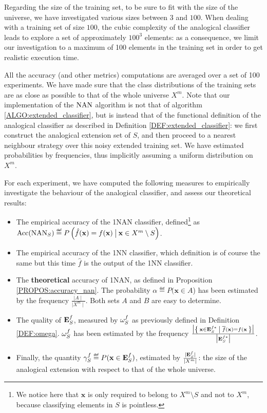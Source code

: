 Regarding the size of the training set, to be sure to fit with the size of the
universe, we have investigated various sizes between $3$ and $100$. When
dealing with a training set of size $100$, the cubic complexity of the
analogical classifier leads to explore a set of approximately $100^3$ elements:
as a consequence, we limit our investigation to a maximum of 100 elements in
the training set in order to get realistic execution time.

All the accuracy (and other metrics) computations are averaged over a set of
100 experiments. We have made sure that the class distributions of the training
sets are as close as possible to that of the whole universe $X^m$.  Note that
our implementation of the $\mbox{NAN}$ algorithm is not that of algorithm
\ref{ALGO:extended_classifier}, but is instead that of the functional
definition of the analogical classifier as described in Definition
\ref{DEF:extended_classifier}: we first construct the analogical extension set
of $S$, and then proceed to a nearest neighbour strategy over this noisy
extended training set. We have estimated probabilities by frequencies, thus
implicitly assuming a uniform distribution on $X^m$.

For each experiment, we have computed the following measures to empirically
investigate the behaviour of the analogical classifier, and assess our
theoretical results:
\begin{itemize}
  \item The empirical accuracy of the 1NAN classifier, defined\footnote{We
    notice here that $\mathbf{x}$ is only required to belong to $X^m \setminus
    S$ and not to $X^m$, because classifying elements in $S$ is pointless.}
    as\\
    $\acc(\NAN_S) \eqdef P\left(\hat{f}(\mathbf{x}) = f(\mathbf{x})
    \given[\big] \mathbf{x} \in X^m \setminus S \right)$.
  \item The empirical accuracy of the 1NN classifier, which definition is of
    course the same but this time $\hat{f}$ is the output of the 1NN
    classifier.
  \item The \textbf{theoretical} accuracy of 1NAN, as defined in Proposition
    \ref{PROPOS:accuracy_nan}. The probability $\alpha \eqdef P(\mathbf{x} \in
    A$) has been estimated by the frequency $\frac{\mid A \mid}{\mid X^m
    \mid}$. Both sets $A$ and $B$ are easy to determine.
  \item The quality of $\mathbf{E}_{S}^{f}$, measured by $\omega_{S}^{f}$ as previously defined in
    Definition  \ref{DEF:omega}. $\omega_{S}^{f}$ has been estimated by the
    frequency $\frac{\big| \Set{\mathbf{x} \in \mathbf{E}_{S}^{f*}| \overline{f}(\mathbf{x}) =
    f(\mathbf{x}}\big|}{\big| \mathbf{E}_{S}^{f*} \big|}$.
  \item Finally, the quantity $\gamma_S^f \eqdef P(\mathbf{x} \in \esf)$,
    estimated by $\frac{\mid \mathbf{E}_{S}^{f}\mid}{\mid X^m \mid}$: the size of the
    analogical extension with respect to that of the whole universe.
\end{itemize}

